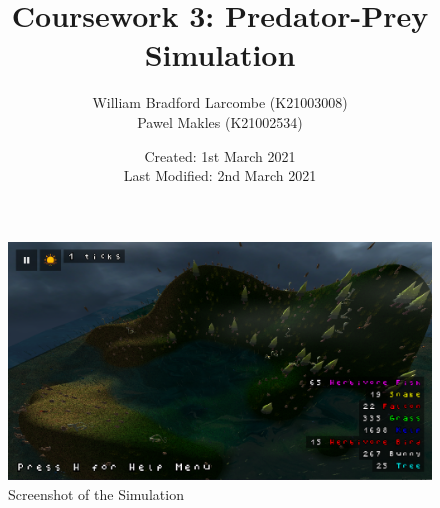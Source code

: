 \documentclass{article}
\title{\Huge Coursework 3: Predator-Prey Simulation}
\author{William Bradford Larcombe \small (K21003008) \\ Pawel Makles \small (K21002534)}
\date{\small Created: 1st March 2021 \\ Last Modified: 2nd March 2021}
\begin{document}
    \maketitle
    \begin{figure}[h]
        \centering
        \includegraphics[width=\textwidth]{../screenshot.png}
        \caption{Screenshot of the Simulation}
    \end{figure}
    
    \newpage
\end{document}
